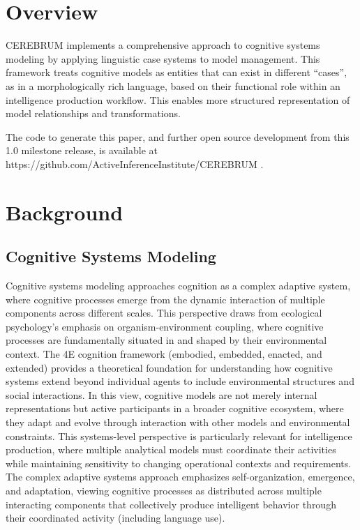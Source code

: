 \hypertarget{overview}{%
\section{Overview}\label{overview}}

CEREBRUM implements a comprehensive approach to cognitive systems
modeling by applying linguistic case systems to model management. This
framework treats cognitive models as entities that can exist in
different ``cases'', as in a morphologically rich language, based on
their functional role within an intelligence production workflow. This
enables more structured representation of model relationships and
transformations.

The code to generate this paper, and further open source development
from this 1.0 milestone release, is available at
https://github.com/ActiveInferenceInstitute/CEREBRUM .

\hypertarget{background}{%
\section{Background}\label{background}}

\hypertarget{cognitive-systems-modeling}{%
\subsection{Cognitive Systems
Modeling}\label{cognitive-systems-modeling}}

Cognitive systems modeling approaches cognition as a complex adaptive
system, where cognitive processes emerge from the dynamic interaction of
multiple components across different scales. This perspective draws from
ecological psychology's emphasis on organism-environment coupling, where
cognitive processes are fundamentally situated in and shaped by their
environmental context. The 4E cognition framework (embodied, embedded,
enacted, and extended) provides a theoretical foundation for
understanding how cognitive systems extend beyond individual agents to
include environmental structures and social interactions. In this view,
cognitive models are not merely internal representations but active
participants in a broader cognitive ecosystem, where they adapt and
evolve through interaction with other models and environmental
constraints. This systems-level perspective is particularly relevant for
intelligence production, where multiple analytical models must
coordinate their activities while maintaining sensitivity to changing
operational contexts and requirements. The complex adaptive systems
approach emphasizes self-organization, emergence, and adaptation,
viewing cognitive processes as distributed across multiple interacting
components that collectively produce intelligent behavior through their
coordinated activity (including language use).

